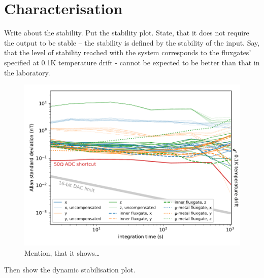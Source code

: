 \section{Characterisation}
Write about the stability. Put the stability plot. State, that it does not require the output to be stable -- the stability is defined by the stability of the input. Say, that the level of stability reached with the system corresponds to the fluxgates' specified at 0.1K temperature drift - cannot be expected to be better than that in the laboratory.

\begin{figure}
  \centering
  \includegraphics[width=0.9\linewidth]{gfx/prototype/run7_field_stability.pdf}
  \caption{Mention, that it shows\ldots}
  \label{fig:prototype_stability}
\end{figure}

Then show the dynamic stabilisation plot.

